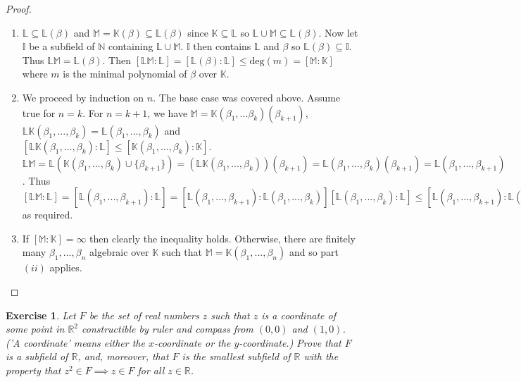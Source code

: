 \documentclass{article}
\newtheorem{exercise}[theorem]{Exercise}
\begin{document}
\begin{proof}
\begin{enumerate}[label=(\roman*)]
    \item $\mathbb{L}\subseteq\mathbb{L}(\beta)$ and $\mathbb{M}=\mathbb{K}(\beta)\subseteq\mathbb{L}(\beta)$ since $\mathbb{K}\subseteq\mathbb{L}$ so $\mathbb{L}\cup\mathbb{M}\subseteq\mathbb{L}(\beta)$. Now let $\mathbb{I}$ be a subfield of $\mathbb{N}$ containing $\mathbb{L}\cup\mathbb{M}$. $\mathbb{I}$ then contains $\mathbb{L}$ and $\beta$ so $\mathbb{L}(\beta)\subseteq\mathbb{I}$. Thus $\mathbb{L}\mathbb{M}=\mathbb{L}(\beta)$. Then $[\mathbb{L}\mathbb{M}:\mathbb{L}]=[\mathbb{L}(\beta):\mathbb{L}]\leq\text{deg}(m)=[\mathbb{M}:\mathbb{K}]$ where $m$ is the minimal polynomial of $\beta$ over $\mathbb{K}$.
    \item We proceed by induction on $n$. The base case was covered above. Assume true for $n=k$. For $n=k+1$, we have $\mathbb{M}=\mathbb{K}(\beta_1,...\beta_k)(\beta_{k+1})$, $\mathbb{L}\mathbb{K}(\beta_1,...,\beta_k)=\mathbb{L}(\beta_1,...,\beta_k)$ and $[\mathbb{L}\mathbb{K}(\beta_1,...,\beta_k):\mathbb{L}]\leq[\mathbb{K}(\beta_1,...,\beta_k):\mathbb{K}]$. $\mathbb{L}\mathbb{M}=\mathbb{L}(\mathbb{K}(\beta_1,...,\beta_k)\cup\{\beta_{k+1}\})=(\mathbb{L}\mathbb{K}(\beta_1,...,\beta_k))(\beta_{k+1})=\mathbb{L}(\beta_1,...,\beta_k)(\beta_{k+1})=\mathbb{L}(\beta_1,...,\beta_{k+1})$. Thus $[\mathbb{L}\mathbb{M}:\mathbb{L}]=[\mathbb{L}(\beta_1,...,\beta_{k+1}):\mathbb{L}]=[\mathbb{L}(\beta_1,...,\beta_{k+1}):\mathbb{L}(\beta_1,...,\beta_k)][\mathbb{L}(\beta_1,...,\beta_k):\mathbb{L}]\leq[\mathbb{L}(\beta_1,...,\beta_{k+1}):\mathbb{L}(\beta_1,...,\beta_k)][\mathbb{K}(\beta_1,...,\beta_k):\mathbb{K}]\leq [\mathbb{K}(\beta_1,...,\beta_{k+1}):\mathbb{K}(\beta_1,...,\beta_k)][\mathbb{K}(\beta_1,...,\beta_k):\mathbb{K}]=[\mathbb{K}(\beta_1,...,\beta_{k+1}):\mathbb{K}]=[\mathbb{M}:\mathbb{K}]$ as required.
    \item If $[\mathbb{M}:\mathbb{K}]=\infty$ then clearly the inequality holds. Otherwise, there are finitely many $\beta_1,...,\beta_n$ algebraic over $\mathbb{K}$ such that $\mathbb{M}=\mathbb{K}(\beta_1,...,\beta_n)$ and so part $(ii)$ applies.
\end{enumerate}
\end{proof}

\begin{exercise}
Let $F$ be the set of real numbers $z$ such that $z$ is a coordinate of some point in $\mathbb{R}^2$ constructible by ruler and compass from $(0,0)$ and $(1,0)$. ('A coordinate' means either the $x$-coordinate or the $y$-coordinate.) Prove that $F$ is a subfield of $\mathbb{R}$, and, moreover, that $F$ is the smallest subfield of $\mathbb{R}$ with the property that $z^2\in F\implies z\in F$ for all $z\in\mathbb{R}$.
\end{exercise}
\end{document}
